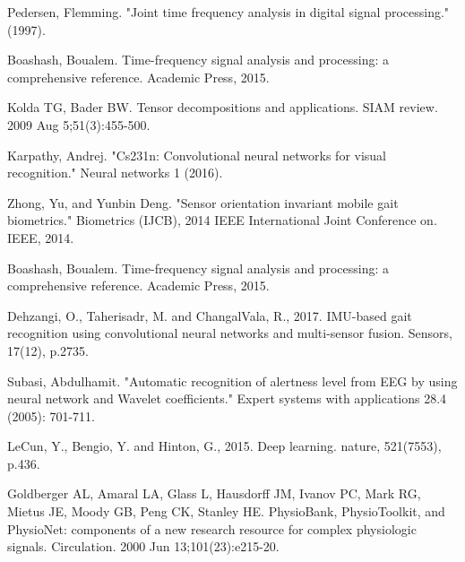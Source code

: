 \documentclass{article}
\begin{document}
\begin{small}
\begin{thebibliography}{00}
Pedersen, Flemming. "Joint time frequency analysis in digital signal processing." (1997).
\vspace{-5pt}



Boashash, Boualem. Time-frequency signal analysis and processing: a comprehensive reference. Academic Press, 2015.
\vspace{-4pt}

Kolda TG, Bader BW. Tensor decompositions and applications. SIAM review. 2009 Aug 5;51(3):455-500.
\vspace{-4pt}

Karpathy, Andrej. "Cs231n: Convolutional neural networks for visual recognition." Neural networks 1 (2016).
\vspace{-3pt}


Zhong, Yu, and Yunbin Deng. "Sensor orientation invariant mobile gait biometrics." Biometrics (IJCB), 2014 IEEE International Joint Conference on. IEEE, 2014.
\vspace{-3pt}




Boashash, Boualem. Time-frequency signal analysis and processing: a comprehensive reference. Academic Press, 2015.
\vspace{-3pt}













Dehzangi, O., Taherisadr, M. and ChangalVala, R., 2017. IMU-based gait recognition using convolutional neural networks and multi-sensor fusion. Sensors, 17(12), p.2735.
\vspace{-3pt}




Subasi, Abdulhamit. "Automatic recognition of alertness level from EEG by using neural network and Wavelet coefficients." Expert systems with applications 28.4 (2005): 701-711.
\vspace{-3pt}

LeCun, Y., Bengio, Y. and Hinton, G., 2015. Deep learning. nature, 521(7553), p.436.
\vspace{-3pt}


Goldberger AL, Amaral LA, Glass L, Hausdorff JM, Ivanov PC, Mark RG, Mietus JE, Moody GB, Peng CK, Stanley HE. PhysioBank, PhysioToolkit, and PhysioNet: components of a new research resource for complex physiologic signals. Circulation. 2000 Jun 13;101(23):e215-20.
\vspace{-3pt}



\end{thebibliography}
\end{small}
\end{document}
